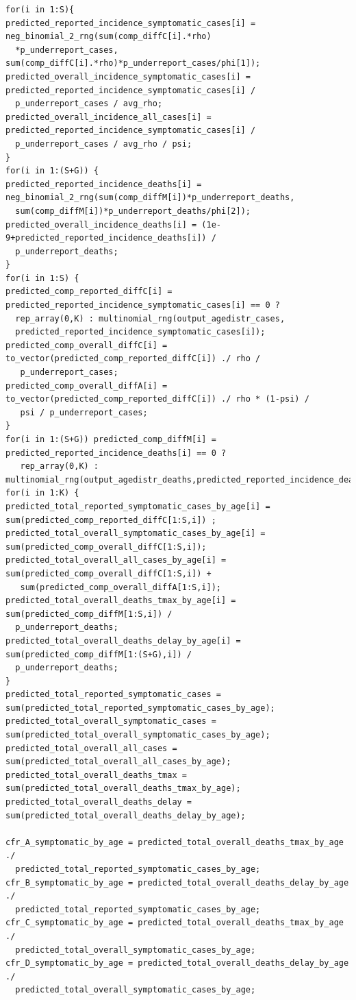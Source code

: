\documentclass{article}
\begin{document}
\begin{verbatim}
for(i in 1:S){
predicted_reported_incidence_symptomatic_cases[i] = neg_binomial_2_rng(sum(comp_diffC[i].*rho)
  *p_underreport_cases, sum(comp_diffC[i].*rho)*p_underreport_cases/phi[1]);
predicted_overall_incidence_symptomatic_cases[i] = predicted_reported_incidence_symptomatic_cases[i] / 
  p_underreport_cases / avg_rho;
predicted_overall_incidence_all_cases[i] = predicted_reported_incidence_symptomatic_cases[i] / 
  p_underreport_cases / avg_rho / psi;
}
for(i in 1:(S+G)) {
predicted_reported_incidence_deaths[i] = neg_binomial_2_rng(sum(comp_diffM[i])*p_underreport_deaths,
  sum(comp_diffM[i])*p_underreport_deaths/phi[2]);
predicted_overall_incidence_deaths[i] = (1e-9+predicted_reported_incidence_deaths[i]) / 
  p_underreport_deaths;
}
for(i in 1:S) {
predicted_comp_reported_diffC[i] = predicted_reported_incidence_symptomatic_cases[i] == 0 ? 
  rep_array(0,K) : multinomial_rng(output_agedistr_cases,
  predicted_reported_incidence_symptomatic_cases[i]);
predicted_comp_overall_diffC[i] = to_vector(predicted_comp_reported_diffC[i]) ./ rho /
   p_underreport_cases;
predicted_comp_overall_diffA[i] = to_vector(predicted_comp_reported_diffC[i]) ./ rho * (1-psi) /
   psi / p_underreport_cases;
}
for(i in 1:(S+G)) predicted_comp_diffM[i] = predicted_reported_incidence_deaths[i] == 0 ?
   rep_array(0,K) : multinomial_rng(output_agedistr_deaths,predicted_reported_incidence_deaths[i]);
for(i in 1:K) {
predicted_total_reported_symptomatic_cases_by_age[i] = sum(predicted_comp_reported_diffC[1:S,i]) ;
predicted_total_overall_symptomatic_cases_by_age[i] = sum(predicted_comp_overall_diffC[1:S,i]);
predicted_total_overall_all_cases_by_age[i] = sum(predicted_comp_overall_diffC[1:S,i]) +
   sum(predicted_comp_overall_diffA[1:S,i]);
predicted_total_overall_deaths_tmax_by_age[i] = sum(predicted_comp_diffM[1:S,i]) / 
  p_underreport_deaths;
predicted_total_overall_deaths_delay_by_age[i] = sum(predicted_comp_diffM[1:(S+G),i]) / 
  p_underreport_deaths;
}
predicted_total_reported_symptomatic_cases = sum(predicted_total_reported_symptomatic_cases_by_age);
predicted_total_overall_symptomatic_cases = sum(predicted_total_overall_symptomatic_cases_by_age);
predicted_total_overall_all_cases = sum(predicted_total_overall_all_cases_by_age);
predicted_total_overall_deaths_tmax = sum(predicted_total_overall_deaths_tmax_by_age);
predicted_total_overall_deaths_delay = sum(predicted_total_overall_deaths_delay_by_age);

cfr_A_symptomatic_by_age = predicted_total_overall_deaths_tmax_by_age ./ 
  predicted_total_reported_symptomatic_cases_by_age;
cfr_B_symptomatic_by_age = predicted_total_overall_deaths_delay_by_age ./ 
  predicted_total_reported_symptomatic_cases_by_age;
cfr_C_symptomatic_by_age = predicted_total_overall_deaths_tmax_by_age ./ 
  predicted_total_overall_symptomatic_cases_by_age;
cfr_D_symptomatic_by_age = predicted_total_overall_deaths_delay_by_age ./ 
  predicted_total_overall_symptomatic_cases_by_age;


\end{verbatim}
\end{document}

